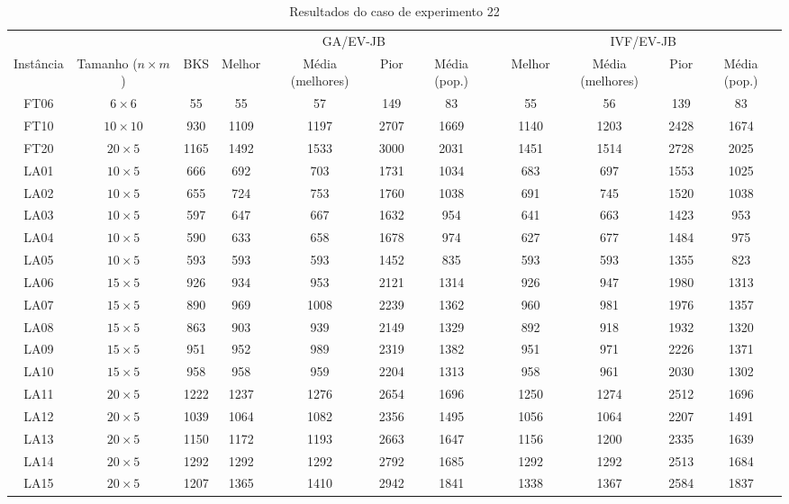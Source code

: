 \begin{sidewaystable}
\caption{Resultados do caso de experimento 22}
\centering
\label{experimento22}
\begin{tabular}{cccccccccccc}
\toprule
& & & \multicolumn{4}{c}{GA/EV-JB} & & \multicolumn{4}{c}{IVF/EV-JB} \\
\cmidrule(c){4-7}
\cmidrule(c){9-12}
Inst\^{a}ncia & Tamanho ($n \times m$) & BKS & Melhor & M\'{e}dia (melhores) & Pior & M\'{e}dia (pop.) & & Melhor & M\'{e}dia (melhores) & Pior & M\'{e}dia (pop.) \\
\midrule
FT06 & $6 \times 6$ & 55 & 55 & 57 & 149 & 83 & & 55 & 56 & 139 & 83 \\
FT10 & $10 \times 10$ & 930 & 1109 & 1197 & 2707 & 1669 & & 1140 & 1203 & 2428 & 1674 \\
FT20 & $20 \times 5$ & 1165 & 1492 & 1533 & 3000 & 2031 & & 1451 & 1514 & 2728 & 2025 \\
LA01 & $10 \times 5$ & 666 & 692 & 703 & 1731 & 1034 & & 683 & 697 & 1553 & 1025 \\
LA02 & $10 \times 5$ & 655 & 724 & 753 & 1760 & 1038 & & 691 & 745 & 1520 & 1038 \\
LA03 & $10 \times 5$ & 597 & 647 & 667 & 1632 & 954 & & 641 & 663 & 1423 & 953 \\
LA04 & $10 \times 5$ & 590 & 633 & 658 & 1678 & 974 & & 627 & 677 & 1484 & 975 \\
LA05 & $10 \times 5$ & 593 & 593 & 593 & 1452 & 835 & & 593 & 593 & 1355 & 823 \\
LA06 & $15 \times 5$ & 926 & 934 & 953 & 2121 & 1314 & & 926 & 947 & 1980 & 1313 \\
LA07 & $15 \times 5$ & 890 & 969 & 1008 & 2239 & 1362 & & 960 & 981 & 1976 & 1357 \\
LA08 & $15 \times 5$ & 863 & 903 & 939 & 2149 & 1329 & & 892 & 918 & 1932 & 1320 \\
LA09 & $15 \times 5$ & 951 & 952 & 989 & 2319 & 1382 & & 951 & 971 & 2226 & 1371 \\
LA10 & $15 \times 5$ & 958 & 958 & 959 & 2204 & 1313 & & 958 & 961 & 2030 & 1302 \\
LA11 & $20 \times 5$ & 1222 & 1237 & 1276 & 2654 & 1696 & & 1250 & 1274 & 2512 & 1696 \\
LA12 & $20 \times 5$ & 1039 & 1064 & 1082 & 2356 & 1495 & & 1056 & 1064 & 2207 & 1491 \\
LA13 & $20 \times 5$ & 1150 & 1172 & 1193 & 2663 & 1647 & & 1156 & 1200 & 2335 & 1639 \\
LA14 & $20 \times 5$ & 1292 & 1292 & 1292 & 2792 & 1685 & & 1292 & 1292 & 2513 & 1684 \\
LA15 & $20 \times 5$ & 1207 & 1365 & 1410 & 2942 & 1841 & & 1338 & 1367 & 2584 & 1837 \\
\bottomrule
\end{tabular}
\end{sidewaystable}
